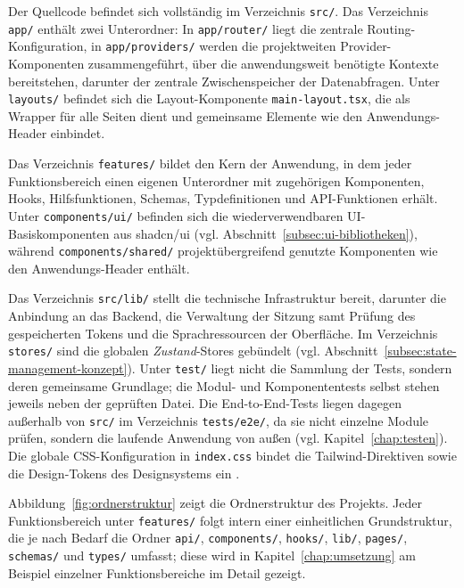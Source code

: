 Der Quellcode befindet sich vollständig im Verzeichnis
\texttt{src/}. Das Verzeichnis \texttt{app/} enthält zwei
Unterordner: In \texttt{app/router/} liegt die zentrale
Routing-Konfiguration, in \texttt{app/providers/} werden die
projektweiten Provider-Komponenten zusammengeführt, über die
anwendungsweit benötigte Kontexte bereitstehen, darunter der zentrale
Zwischenspeicher der Datenabfragen. Unter \texttt{layouts/} befindet
sich die Layout-Komponente \texttt{main-layout.tsx}, die als Wrapper
für alle Seiten dient und gemeinsame Elemente wie den
Anwendungs-Header einbindet.

Das Verzeichnis \texttt{features/} bildet den Kern der Anwendung, in
dem jeder Funktionsbereich einen eigenen Unterordner mit zugehörigen
Komponenten, Hooks, Hilfsfunktionen, Schemas, Typdefinitionen und
\acs{API}-Funktionen erhält. Unter \texttt{components/ui/} befinden
sich die wiederverwendbaren \acs{UI}-Basiskomponenten aus shadcn/ui
(vgl. Abschnitt~\ref{subsec:ui-bibliotheken}), während
\texttt{components/shared/} projektübergreifend genutzte Komponenten
wie den Anwendungs-Header enthält.

Das Verzeichnis \texttt{src/lib/} stellt die technische Infrastruktur
bereit, darunter die Anbindung an das Backend, die Verwaltung der
Sitzung samt Prüfung des gespeicherten Tokens und die Sprachressourcen
der Oberfläche. Im Verzeichnis \texttt{stores/} sind die globalen
\textit{Zustand}-Stores gebündelt (vgl.
Abschnitt~\ref{subsec:state-management-konzept}). Unter
\texttt{test/} liegt nicht die Sammlung der Tests, sondern deren
gemeinsame Grundlage; die Modul- und Komponententests selbst stehen
jeweils neben der geprüften Datei. Die End-to-End-Tests liegen dagegen
außerhalb von \texttt{src/} im Verzeichnis \texttt{tests/e2e/}, da sie
nicht einzelne Module prüfen, sondern die laufende Anwendung von außen
(vgl. Kapitel~\ref{chap:testen}). Die globale
\acs{CSS}-Konfiguration in \texttt{index.css} bindet die
Tailwind-Direktiven sowie die Design-Tokens des Designsystems ein
\cite{tailwindcss_docs}.

Abbildung~\ref{fig:ordnerstruktur} zeigt die Ordnerstruktur des
Projekts. Jeder Funktionsbereich unter \texttt{features/} folgt
intern einer einheitlichen Grundstruktur, die je nach Bedarf die
Ordner \texttt{api/}, \texttt{components/}, \texttt{hooks/},
\texttt{lib/}, \texttt{pages/}, \texttt{schemas/} und \texttt{types/}
umfasst; diese wird in Kapitel~\ref{chap:umsetzung} am Beispiel
einzelner Funktionsbereiche im Detail gezeigt.

